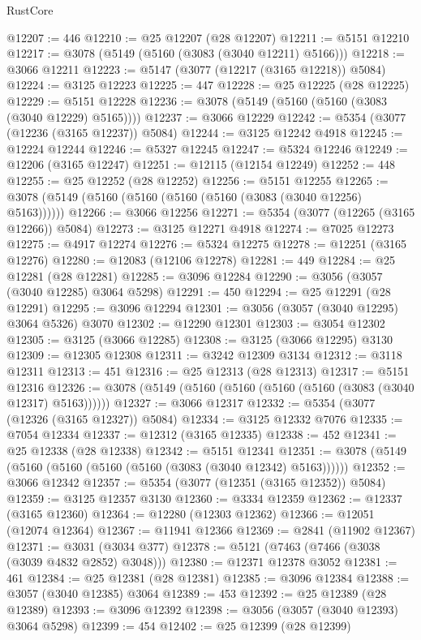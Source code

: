 \begin{lexlean}{RustCore}
\begin{coremodule}
@12207 := 446
@12210 := @25 @12207 (@28 @12207)
@12211 := @5151 @12210
@12217 := @3078 (@5149 (@5160 (@3083 (@3040 @12211) @5166)))
@12218 := @3066 @12211
@12223 := @5147 (@3077 (@12217 (@3165 @12218)) @5084)
@12224 := @3125 @12223
@12225 := 447
@12228 := @25 @12225 (@28 @12225)
@12229 := @5151 @12228
@12236 := @3078 (@5149 (@5160 (@5160 (@3083 (@3040 @12229) @5165))))
@12237 := @3066 @12229
@12242 := @5354 (@3077 (@12236 (@3165 @12237)) @5084)
@12244 := @3125 @12242 @4918
@12245 := @12224 @12244
@12246 := @5327 @12245
@12247 := @5324 @12246
@12249 := @12206 (@3165 @12247)
@12251 := @12115 (@12154 @12249)
@12252 := 448
@12255 := @25 @12252 (@28 @12252)
@12256 := @5151 @12255
@12265 := @3078 (@5149 (@5160 (@5160 (@5160 (@5160 (@3083 (@3040 @12256) @5163))))))
@12266 := @3066 @12256
@12271 := @5354 (@3077 (@12265 (@3165 @12266)) @5084)
@12273 := @3125 @12271 @4918
@12274 := @7025 @12273
@12275 := @4917 @12274
@12276 := @5324 @12275
@12278 := @12251 (@3165 @12276)
@12280 := @12083 (@12106 @12278)
@12281 := 449
@12284 := @25 @12281 (@28 @12281)
@12285 := @3096 @12284
@12290 := @3056 (@3057 (@3040 @12285) @3064 @5298)
@12291 := 450
@12294 := @25 @12291 (@28 @12291)
@12295 := @3096 @12294
@12301 := @3056 (@3057 (@3040 @12295) @3064 @5326) @3070
@12302 := @12290 @12301
@12303 := @3054 @12302
@12305 := @3125 (@3066 @12285)
@12308 := @3125 (@3066 @12295) @3130
@12309 := @12305 @12308
@12311 := @3242 @12309 @3134
@12312 := @3118 @12311
@12313 := 451
@12316 := @25 @12313 (@28 @12313)
@12317 := @5151 @12316
@12326 := @3078 (@5149 (@5160 (@5160 (@5160 (@5160 (@3083 (@3040 @12317) @5163))))))
@12327 := @3066 @12317
@12332 := @5354 (@3077 (@12326 (@3165 @12327)) @5084)
@12334 := @3125 @12332 @7076
@12335 := @7054 @12334
@12337 := @12312 (@3165 @12335)
@12338 := 452
@12341 := @25 @12338 (@28 @12338)
@12342 := @5151 @12341
@12351 := @3078 (@5149 (@5160 (@5160 (@5160 (@5160 (@3083 (@3040 @12342) @5163))))))
@12352 := @3066 @12342
@12357 := @5354 (@3077 (@12351 (@3165 @12352)) @5084)
@12359 := @3125 @12357 @3130
@12360 := @3334 @12359
@12362 := @12337 (@3165 @12360)
@12364 := @12280 (@12303 @12362)
@12366 := @12051 (@12074 @12364)
@12367 := @11941 @12366
@12369 := @2841 (@11902 @12367)
@12371 := @3031 (@3034 @377)
@12378 := @5121 (@7463 (@7466 (@3038 (@3039 @4832 @2852) @3048)))
@12380 := @12371 @12378 @3052
@12381 := 461
@12384 := @25 @12381 (@28 @12381)
@12385 := @3096 @12384
@12388 := @3057 (@3040 @12385) @3064
@12389 := 453
@12392 := @25 @12389 (@28 @12389)
@12393 := @3096 @12392
@12398 := @3056 (@3057 (@3040 @12393) @3064 @5298)
@12399 := 454
@12402 := @25 @12399 (@28 @12399)

\end{coremodule}
\end{lexlean}
